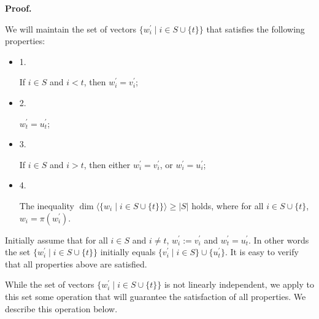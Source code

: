 \par\medskip\noindent\textbf{
Proof.}\par


We will maintain the set of vectors $\{w^{\prime}_{i}\mid i\in S\cup\{t\}\}$ that satisfies the following properties:\par


\begin{itemize}


\item 
1. 


If $i\in S$ and $i<t$, then $w^{\prime}_{i}=v_{i}^{\prime}$;\par





\item 
2. 


$w^{\prime}_{t}=u^{\prime}_{t}$;\par





\item 
3. 


If $i\in S$ and $i>t$, then either $w^{\prime}_{i}=v_{i}^{\prime}$, or $w^{\prime}_{i}=u_{i}^{\prime}$;\par





\item 
4. 


The inequality $\dim\langle\{w_{i}\mid i\in S\cup\{t\}\}\rangle\geq|S|$ holds, where for all $i\in S\cup\{t\}$, $w_{i}=\pi(w^{\prime}_{i})$.\par





\end{itemize}



Initially assume that for all $i\in S$ and $i\neq t$, $w^{\prime}_{i}:=v_{i}^{\prime}$ and $w^{\prime}_{t}=u^{\prime}_{t}$. In other words the set $\{w_{i}^{\prime}\mid i\in S\cup\{t\}\}$ initially equals $\{v_{i}^{\prime}\mid i\in S\}\cup\{u^{\prime}_{t}\}$. It is easy to verify that all properties above are satisfied.\par



While the set of vectors $\{w_{i}^{\prime}\mid i\in S\cup\{t\}\}$ is not linearly independent, we apply to this set some operation that will guarantee the satisfaction of all properties. We describe this operation below.\par



